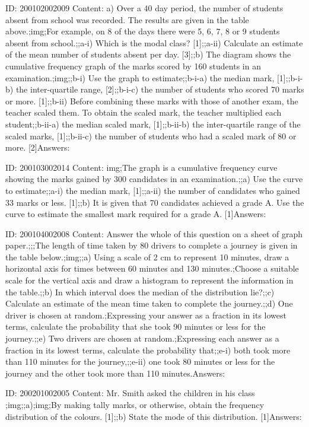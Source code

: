 \documentclass{article}
\begin{document}
ID: 200102002009
Content:
a) Over a 40 day period, the number of students absent from school was recorded. The results are given in the table above.;img;For example, on 8 of the days there were 5, 6, 7, 8 or 9 students absent from school.;;a-i) Which is the modal class? [1];;a-ii) Calculate an estimate of the mean number of students absent per day. [3];;b) The diagram shows the cumulative frequency graph of the marks scored by 160 students in an examination.;img;;b-i) Use the graph to estimate;;b-i-a) the median mark, [1];;b-i-b) the inter-quartile range, [2];;b-i-c) the number of students who scored 70 marks or more. [1];;b-ii) Before combining these marks with those of another exam, the teacher scaled them. To obtain the scaled mark, the teacher multiplied each student;;b-ii-a) the median scaled mark, [1];;b-ii-b) the inter-quartile range of the scaled marks, [1];;b-ii-c) the number of students who had a scaled mark of 80 or more. [2]Answers:

ID: 200103002014
Content:
img;The graph is a cumulative frequency curve showing the marks gained by 300 candidates in an examination.;;a) Use the curve to estimate;;a-i) the median mark,    [1];;a-ii) the number of candidates who gained 33 marks or less.    [1];;b) It is given that 70 candidates achieved a grade A. Use the curve to estimate the smallest mark required for a grade A.    [1]Answers:

ID: 200104002008
Content:
Answer the whole of this question on a sheet of graph paper.;;;The length of time taken by 80 drivers to complete a journey is given in the table below.;img;;a) Using a scale of 2 cm to represent 10 minutes, draw a horizontal axis for times between 60 minutes and 130 minutes.;Choose a suitable scale for the vertical axis and draw a histogram to represent the information in the table.;;b) In which interval does the median of the distribution lie?;;c) Calculate an estimate of the mean time taken to complete the journey.;;d) One driver is chosen at random.;Expressing your answer as a fraction in its lowest terms, calculate the probability that she took 90 minutes or less for the journey.;;e) Two drivers are chosen at random.;Expressing each answer as a fraction in its lowest terms, calculate the probability that;;e-i) both took more than 110 minutes for the journey,;;e-ii) one took 80 minutes or less for the journey and the other took more than 110 minutes.Answers:

ID: 200201002005
Content:
Mr. Smith asked the children in his class ;img;;a);img;By making tally marks, or otherwise, obtain the frequency distribution of the colours. [1];;b) State the mode of this distribution. [1]Answers:
\end{document}
